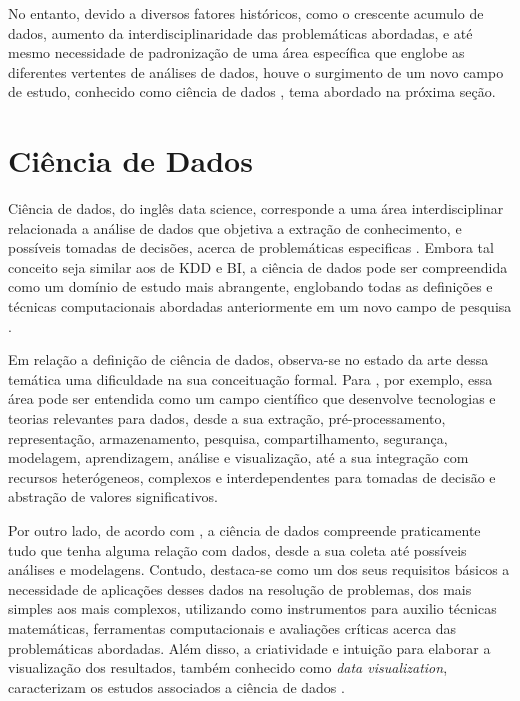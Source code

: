 No entanto, devido a diversos fatores históricos, como o crescente acumulo de dados, aumento da interdisciplinaridade das problemáticas abordadas, e até mesmo necessidade de padronização de uma área específica que englobe as diferentes vertentes de análises de dados, houve o surgimento de um novo campo de estudo, conhecido como ciência de dados \cite{cap02_ref2, cap02_ref9, cap02_ref33, cap02_ref32}, tema abordado na próxima seção.

\section{Ciência de Dados}

Ciência de dados, do inglês data science, corresponde a uma área interdisciplinar relacionada a análise de dados que objetiva a extração de conhecimento, e possíveis tomadas de decisões, acerca de problemáticas especificas \cite{cap02_ref1, cap02_ref4}. Embora tal conceito seja similar aos de KDD e BI, a ciência de dados pode ser compreendida como um domínio de estudo mais abrangente, englobando todas as definições e técnicas computacionais abordadas anteriormente em um novo campo de pesquisa \cite{cap02_ref2}.

Em relação a definição de ciência de dados, observa-se no estado da arte dessa temática uma dificuldade na sua conceituação formal. Para \cite{cap02_ref33}, por exemplo, essa área pode ser entendida como um campo científico que desenvolve tecnologias e teorias relevantes para dados, desde a sua extração, pré-processamento, representação, armazenamento, pesquisa, compartilhamento, segurança, modelagem, aprendizagem, análise e visualização, até a sua integração com recursos heterógeneos, complexos e interdependentes para tomadas de decisão e abstração de valores significativos.

Por outro lado, de acordo com \cite{cap02_ref34}, a ciência de dados compreende praticamente tudo que tenha alguma relação com dados, desde a sua coleta até possíveis análises e modelagens. Contudo, destaca-se como um dos seus requisitos básicos a necessidade de aplicações desses dados na resolução de problemas, dos mais simples aos mais complexos, utilizando como instrumentos para auxilio técnicas matemáticas, ferramentas computacionais e avaliações críticas acerca das problemáticas abordadas. Além disso, a criatividade e intuição para elaborar a visualização dos resultados, também conhecido como \textit{data visualization}, caracterizam os estudos associados a ciência de dados \cite{cap02_ref18}.

